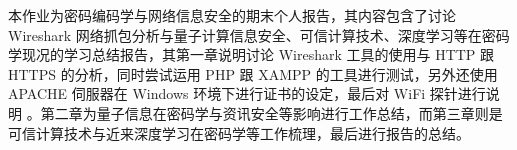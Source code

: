 \begin{cabstract}

本作业为密码编码学与网络信息安全的期末个人报告，其内容包含了讨论 Wireshark 网络抓包分析与量子计算信息安全、可信计算技术、深度学习等在密码学现况的学习总结报告，其第一章说明讨论 Wireshark 工具的使用与 HTTP 跟 HTTPS 的分析，同时尝试运用 PHP 跟 XAMPP 的工具进行测试，另外还使用 APACHE 伺服器在 Windows 环境下进行证书的设定，最后对 WiFi 探针进行说明 。第二章为量子信息在密码学与资讯安全等影响进行工作总结，而第三章则是可信计算技术与近来深度学习在密码学等工作梳理，最后进行报告的总结。

\end{cabstract}



